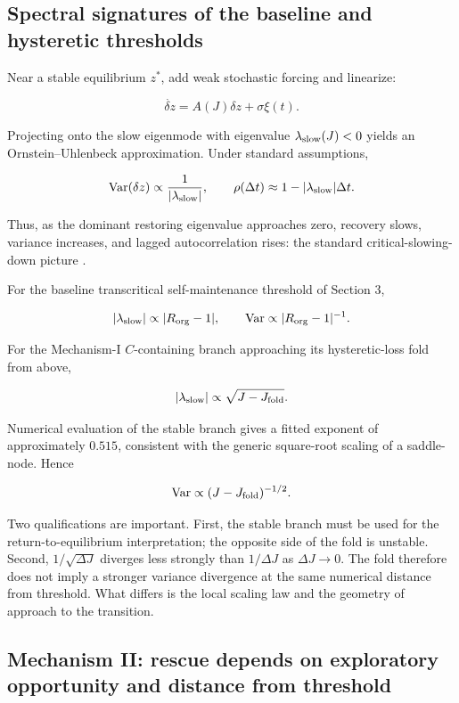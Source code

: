 \documentclass[11pt,a4paper]{article}
\begin{document}
\subsection{Spectral signatures of the baseline and hysteretic
thresholds}\label{spectral-signatures-of-the-baseline-and-hysteretic-thresholds}

Near a stable equilibrium \(z^*\), add weak stochastic forcing and
linearize:

\[
\dot{\delta z}=A(J)\delta z+\sigma\xi(t).
\]

Projecting onto the slow eigenmode with eigenvalue
\(\lambda_{\rm slow}(J)<0\) yields an Ornstein--Uhlenbeck approximation.
Under standard assumptions,

\[
{\rm Var}(\delta z)\propto\frac{1}{|\lambda_{\rm slow}|},
\qquad
\rho(\Delta t)\approx1-|\lambda_{\rm slow}|\Delta t.
\]

Thus, as the dominant restoring eigenvalue approaches zero, recovery
slows, variance increases, and lagged autocorrelation rises: the
standard critical-slowing-down picture \citep{Scheffer2009, Dakos2012}.

For the baseline transcritical self-maintenance threshold of Section 3,

\[
|\lambda_{\rm slow}|
\propto
|R_{\rm org}-1|,
\qquad
{\rm Var}
\propto
|R_{\rm org}-1|^{-1}.
\]

For the Mechanism-I \(C\)-containing branch approaching its
hysteretic-loss fold from above,

\[
|\lambda_{\rm slow}|
\propto
\sqrt{J-J_{\rm fold}}.
\]

Numerical evaluation of the stable branch gives a fitted exponent of
approximately \(0.515\), consistent with the generic square-root scaling
of a saddle-node. Hence

\[
{\rm Var}
\propto
(J-J_{\rm fold})^{-1/2}.
\]

Two qualifications are important. First, the stable branch must be used
for the return-to-equilibrium interpretation; the opposite side of the
fold is unstable. Second, \(1/\sqrt{\Delta J}\) diverges less strongly
than \(1/\Delta J\) as \(\Delta J\to0\). The fold therefore does not
imply a stronger variance divergence at the same numerical distance from
threshold. What differs is the local scaling law and the geometry of
approach to the transition.

\subsection{Mechanism II: rescue depends on exploratory opportunity and
distance from
threshold}\label{mechanism-ii-rescue-depends-on-exploratory-opportunity-and-distance-from-threshold}
\end{document}
